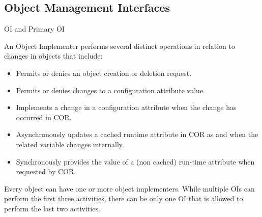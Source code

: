 \begin{flushleft}
\subsection{Object Management Interfaces}
\begin{Desc}
\item
[OI and Primary OI]\end{Desc}
An Object Implementer performs several distinct operations in relation to changes in objects that include: 
\begin{itemize}
\item
Permits or denies an object creation or deletion request.
\item
Permits or denies changes to a configuration attribute value.
\item
Implements a change in a configuration attribute when the change has occurred in COR.
\item
Asynchronously updates a cached runtime attribute in COR as and when the related variable changes internally.
\item
Synchronously provides the value of a (non cached) run-time attribute when requested by COR.
\end{itemize}
Every object can have one or more object implementers. While multiple OIs can perform the first three activities, there can be only one OI that is 
allowed to perform the last two activities. 


\end{flushleft}
